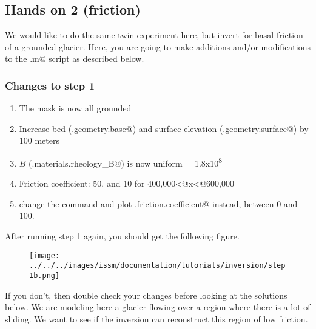 \subsection{Hands on 2 (friction)} %
We would like to do the same twin experiment here, but invert for basal friction of a grounded glacier. Here, you are going to make additions and/or modifications to the \verb@runme.m@ script as described below.

\subsubsection{Changes to step 1}
\begin{enumerate}
	\item The mask is now all grounded
	\item Increase bed (\verb@md.geometry.base@) and surface elevation (\verb@md.geometry.surface@) by 100 meters
	\item $B$ (\verb@md.materials.rheology_B@) is now uniform = 1.8x10\textsuperscript{8}
	\item Friction coefficient: 50, and 10 for 400,000\verb@<@x\verb@<@600,000
	\item change the \verb@plotmodel@ command and plot \verb@md.friction.coefficient@ instead, between 0 and 100.
\end{enumerate}
After running step 1 again, you should get the following figure.
\begin{figure}[H]
	\begin{center}
		\texttt{[image: ../../../images/issm/documentation/tutorials/inversion/step1b.png]}
	\end{center}
\end{figure}
If you don't, then double check your changes before looking at the solutions below. We are modeling here a glacier flowing over a region where there is a lot of sliding. We want to see if the inversion can reconstruct this region of low friction.

